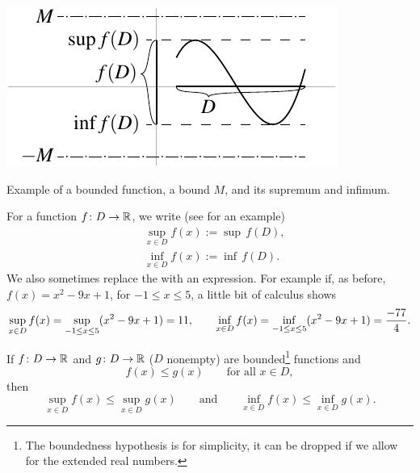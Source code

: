 \begin{myfigureht}
\includegraphics{figures/boundedfunc}
\caption{Example of a bounded function, a bound $M$, and its supremum and infimum.\label{boundedfuncfig}}
\end{myfigureht}
For a function $f \colon D \to \R$, we write
(see  for
an example)
\begin{align*}
& \sup_{x \in D} f(x) := \sup\, f(D) , \\
& \inf_{x \in D} f(x) := \inf\, f(D) .
\end{align*}
We also sometimes replace the  with an expression.
For example if, as before, $f(x) = x^2-9x+1$, for $-1 \leq x \leq 5$, 
a little bit of calculus shows
\begin{equation*}
\sup_{x \in D} f(x) = 
\sup_{-1 \leq x \leq 5} ( x^2 -9x+1 ) = 11,
\qquad
\inf_{x \in D} f(x) = 
\inf_{-1 \leq x \leq 5} ( x^2 -9x+1 ) = \nicefrac{-77}{4} .
\end{equation*}



\begin{prop} \label{prop:funcsupinf}
If $f \colon D \to \R$ and $g \colon D \to \R$ ($D$ nonempty) are
bounded\footnote{The boundedness hypothesis is for simplicity,
it can be dropped if we allow for the extended real numbers.}
functions and
\begin{equation*}
f(x) \leq g(x) \qquad \text{for all } x \in D,
\end{equation*}
then
\begin{equation} \label{prop:funcsupinf:eq}
\sup_{x \in D} f(x) \leq \sup_{x \in D} g(x)
\qquad \text{and} \qquad
\inf_{x \in D} f(x) \leq \inf_{x \in D} g(x) .
\end{equation}
\end{prop}

